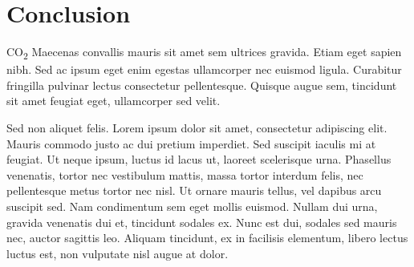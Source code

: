 \section*{Conclusion}

CO\textsubscript{2} Maecenas convallis mauris sit amet sem ultrices gravida. Etiam eget sapien nibh. Sed ac ipsum eget enim egestas ullamcorper nec euismod ligula. Curabitur fringilla pulvinar lectus consectetur pellentesque. Quisque augue sem, tincidunt sit amet feugiat eget, ullamcorper sed velit.

Sed non aliquet felis. Lorem ipsum dolor sit amet, consectetur adipiscing elit. Mauris commodo justo ac dui pretium imperdiet. Sed suscipit iaculis mi at feugiat. Ut neque ipsum, luctus id lacus ut, laoreet scelerisque urna. Phasellus venenatis, tortor nec vestibulum mattis, massa tortor interdum felis, nec pellentesque metus tortor nec nisl. Ut ornare mauris tellus, vel dapibus arcu suscipit sed. Nam condimentum sem eget mollis euismod. Nullam dui urna, gravida venenatis dui et, tincidunt sodales ex. Nunc est dui, sodales sed mauris nec, auctor sagittis leo. Aliquam tincidunt, ex in facilisis elementum, libero lectus luctus est, non vulputate nisl augue at dolor.
